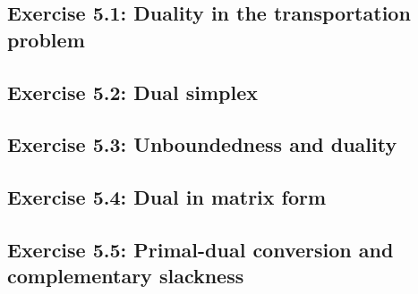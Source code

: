 \subsection*{Exercise 5.1: Duality in the transportation problem}


\subsection*{Exercise 5.2: Dual simplex}


\subsection*{Exercise 5.3: Unboundedness and duality}


\subsection*{Exercise 5.4: Dual in matrix form}


\subsection*{Exercise 5.5: Primal-dual conversion and complementary slackness}






